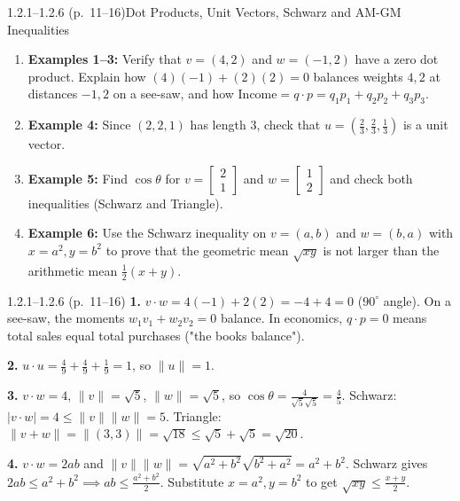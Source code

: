 \documentclass[11pt,a4paper,openany,oneside]{book}
\def\vect#1{#1}%
\def\mathbf#1{#1}%
\newcommand{\vect}[1]{\mathbf{#1}}
\numberwithin{equation}{chapter}
\begin{document}
\begin{example}{1.2.1--1.2.6 (p.\ 11--16)}{Dot Products, Unit Vectors, Schwarz and AM-GM Inequalities}
\begin{enumerate}
\item \textbf{Examples 1--3:} Verify that $\vect{v}=(4,2)$ and $\vect{w}=(-1,2)$ have a zero dot product. Explain how $(4)(-1)+(2)(2)=0$ balances weights $4,2$ at distances $-1,2$ on a see-saw, and how $\text{Income} = \vect{q}\cdot\vect{p} = q_1p_1+q_2p_2+q_3p_3$.
\item \textbf{Example 4:} Since $(2,2,1)$ has length $3$, check that $\vect{u} = (\frac{2}{3}, \frac{2}{3}, \frac{1}{3})$ is a unit vector.
\item \textbf{Example 5:} Find $\cos\theta$ for $\vect{v} = \begin{bmatrix}2\\1\end{bmatrix}$ and $\vect{w} = \begin{bmatrix}1\\2\end{bmatrix}$ and check both inequalities (Schwarz and Triangle).
\item \textbf{Example 6:} Use the Schwarz inequality on $\vect{v}=(a,b)$ and $\vect{w}=(b,a)$ with $x=a^2, y=b^2$ to prove that the geometric mean $\sqrt{xy}$ is not larger than the arithmetic mean $\frac{1}{2}(x+y)$.
\end{enumerate}
\end{example}

\vfill
\begin{pageend_sol}{1.2.1--1.2.6 (p.\ 11--16)}
\textbf{1.} $\vect{v}\cdot\vect{w} = 4(-1) + 2(2) = -4 + 4 = 0$ ($90^\circ$ angle). On a see-saw, the moments $w_1v_1 + w_2v_2 = 0$ balance. In economics, $\vect{q}\cdot\vect{p} = 0$ means total sales equal total purchases ("the books balance").

\textbf{2.} $\vect{u}\cdot\vect{u} = \frac{4}{9} + \frac{4}{9} + \frac{1}{9} = 1$, so $\|\vect{u}\| = 1$.

\textbf{3.} $\vect{v}\cdot\vect{w} = 4$, $\|\vect{v}\| = \sqrt{5}$, $\|\vect{w}\| = \sqrt{5}$, so $\cos\theta = \frac{4}{\sqrt{5}\sqrt{5}} = \frac{4}{5}$. Schwarz: $|\vect{v}\cdot\vect{w}| = 4 \le \|\vect{v}\|\|\vect{w}\| = 5$. Triangle: $\|\vect{v}+\vect{w}\| = \|(3,3)\| = \sqrt{18} \le \sqrt{5}+\sqrt{5} = \sqrt{20}$.

\textbf{4.} $\vect{v}\cdot\vect{w} = 2ab$ and $\|\vect{v}\|\|\vect{w}\| = \sqrt{a^2+b^2}\sqrt{b^2+a^2} = a^2+b^2$. Schwarz gives $2ab \le a^2+b^2 \implies ab \le \frac{a^2+b^2}{2}$. Substitute $x=a^2, y=b^2$ to get $\sqrt{xy} \le \frac{x+y}{2}$.
\end{pageend_sol}
\clearpage
\end{document}
